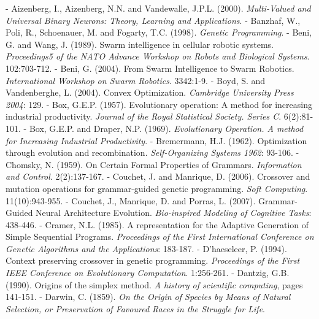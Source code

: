 \documentclass[spanish,a4paper,12pt,twoside]{report}
\begin{document}
  \begin{thebibliography}{00}
  \vspace{-1cm}
  \makeatletter
  \def\@biblabel#1{}
  \let\old@bibitem\bibitem
  \def\bibitem#1{\old@bibitem{#1}\leavevmode\kern-\bibindent}
  \makeatother
  
   Aizenberg, I., Aizenberg, N.N. and Vandewalle, J.P.L. (2000). \emph{Multi-Valued and Universal Binary Neurons: Theory, Learning and Applications}.
   Banzhaf, W., Poli, R., Schoenauer, M. and Fogarty, T.C. (1998). \emph{Genetic Programming}.
   Beni, G. and Wang, J. (1989). Swarm intelligence in cellular robotic systems. \emph{Proceedings5 of the NATO Advance Workshop on Robots and Biological Systems}. 102:703-712.
   Beni, G. (2004). From Swarm Intelligence to Swarm Robotics. \emph{International Workshop on Swarm Robotics}. 3342:1-9.
   Boyd, S. and Vandenberghe, L. (2004). Convex Optimization. \emph{Cambridge University Press 2004}: 129.
   Box, G.E.P. (1957). Evolutionary operation: A method for increasing industrial productivity. \emph{Journal of the Royal Statistical Society. Series C}. 6(2):81-101.
   Box, G.E.P. and Draper, N.P. (1969). \emph{Evolutionary Operation. A method for Increasing Industrial Productivity}.
   Bremermann, H.J. (1962). Optimization through evolution and recombination. \emph{Self-Organizing Systems 1962}: 93-106.
   Chomsky, N. (1959). On Certain Formal Properties of Grammars. \emph{Information and Control}. 2(2):137-167.
   Couchet, J. and Manrique, D. (2006). Crossover and mutation operations for grammar-guided genetic programming. \emph{Soft Computing}. 11(10):943-955.
   Couchet, J., Manrique, D. and Porras, L. (2007). Grammar-Guided Neural Architecture Evolution. \emph{Bio-inspired Modeling of Cognitive Tasks}: 438-446.
   Cramer, N.L. (1985). A representation for the Adaptive Generation of Simple Sequential Programs. \emph{Proceedings of the First International Conference on Genetic Algorithms and the Applications}: 183-187.
   D'haeseleer, P. (1994). Context preserving crossover in genetic programming. \emph{Proceedings of the First IEEE Conference on Evolutionary Computation}. 1:256-261.
   Dantzig, G.B. (1990). Origins of the simplex method. \emph{A history of scientific computing}, pages 141-151.
   Darwin, C. (1859). \emph{On the Origin of Species by Means of Natural Selection, or Preservation of Favoured Races in the Struggle for Life}. 

\end{thebibliography}
\end{document}
